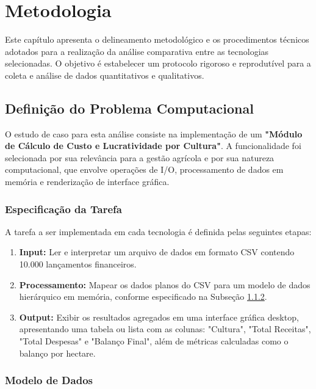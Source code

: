 
\chapter{Metodologia}
\label{cha:metodologia}

Este capítulo apresenta o delineamento metodológico e os procedimentos técnicos adotados para a realização da análise comparativa entre as tecnologias selecionadas. O objetivo é estabelecer um protocolo rigoroso e reprodutível para a coleta e análise de dados quantitativos e qualitativos.

\section{Definição do Problema Computacional}
\label{sec:problema_computacional}

O estudo de caso para esta análise consiste na implementação de um \textbf{"Módulo de Cálculo de Custo e Lucratividade por Cultura"}. A funcionalidade foi selecionada por sua relevância para a gestão agrícola e por sua natureza computacional, que envolve operações de I/O, processamento de dados em memória e renderização de interface gráfica.

\subsection{Especificação da Tarefa}
A tarefa a ser implementada em cada tecnologia é definida pelas seguintes etapas:
\begin{enumerate}
	\item \textbf{Input:} Ler e interpretar um arquivo de dados em formato CSV contendo 10.000 lançamentos financeiros.
	\item \textbf{Processamento:} Mapear os dados planos do CSV para um modelo de dados hierárquico em memória, conforme especificado na Subseção \ref{ssec:modelo_dados}.
	\item \textbf{Output:} Exibir os resultados agregados em uma interface gráfica desktop, apresentando uma tabela ou lista com as colunas: "Cultura", "Total Receitas", "Total Despesas" e "Balanço Final", além de métricas calculadas como o balanço por hectare.
\end{enumerate}

\subsection{Modelo de Dados}
\label{ssec:modelo_dados}

